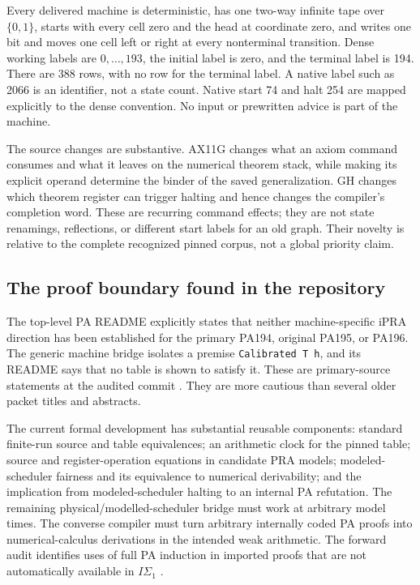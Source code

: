 \documentclass[11pt]{article}
\theoremstyle{definition}\newtheorem{definition}[theorem]{Definition}
\begin{document}
Every delivered machine is deterministic, has one two-way infinite tape
over $\{0,1\}$, starts with every cell zero and the head at coordinate zero,
and writes one bit and moves one cell left or right at every nonterminal
transition. Dense working labels are $0,\ldots,193$, the initial label is
zero, and the terminal label is 194. There are 388 rows, with no row for
the terminal label. A native label such as 2066 is an identifier, not a
state count. Native start 74 and halt 254 are mapped explicitly to the
dense convention. No input or prewritten advice is part of the machine.



The source changes are substantive. AX11G changes what an axiom command
consumes and what it leaves on the numerical theorem stack, while making
its explicit operand determine the binder of the saved generalization.
GH changes which theorem register can trigger halting and hence changes
the compiler's completion word. These are recurring command effects;
they are not state renamings, reflections, or different start labels for
an old graph. Their novelty is relative to the complete recognized pinned
corpus, not a global priority claim.

\subsection{The proof boundary found in the repository}

The top-level PA README explicitly states that neither machine-specific
iPRA direction has been established for the primary PA194, original PA195,
or PA196. The generic machine bridge isolates a premise
\texttt{Calibrated T h}, and its README says that no table is shown to
satisfy it. These are primary-source statements at the audited commit
\cite{pa-readme,isigma-machine}. They are more cautious than several
older packet titles and abstracts.

The current formal development has substantial reusable components:
standard finite-run source and table equivalences; an arithmetic clock
for the pinned table; source and register-operation equations in candidate
PRA models; modeled-scheduler fairness and its equivalence to numerical
derivability; and the implication from modeled-scheduler halting to an
internal PA refutation. The remaining physical/modelled-scheduler bridge
must work at arbitrary model times. The converse compiler must turn
arbitrary internally coded PA proofs into numerical-calculus derivations
in the intended weak arithmetic. The forward audit identifies uses of
full PA induction in imported proofs that are not automatically available
in $I\Sigma_1$ \cite{forward-audit}.
\end{document}

